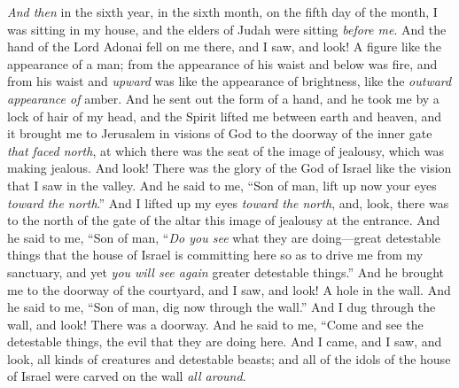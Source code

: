 \begin{biblechapter} %
 \textit{And then} in the sixth year, in the sixth month, on the fifth day of the month, I was sitting in my house, and the elders of Judah were sitting \textit{before me}. And the hand of the Lord Adonai fell on me there,
\verse and I saw, and look! A figure like the appearance of a man; from the appearance of his waist and below was fire, and from his waist and \textit{upward} was like the appearance of brightness, like the \textit{outward appearance of} amber.
\verse And he sent out the form of a hand, and he took me by a lock of hair of my head, and the Spirit lifted me between earth and heaven, and it brought me to Jerusalem in visions of God to the doorway of the inner gate \textit{that faced north}, at which there was the seat of the image of jealousy, which was making jealous.
\verse And look! There was the glory of the God of Israel like the vision that I saw in the valley.
\verse And he said to me, “Son of man, lift up now your eyes \textit{toward the north}.” And I lifted up my eyes \textit{toward the north}, and, look, there was to the north of the gate of the altar this image of jealousy at the entrance.
\verse And he said to me, “Son of man, “\textit{Do you see} what they are doing—great detestable things that the house of Israel is committing here so as to drive me from my sanctuary, and yet \textit{you will see again} greater detestable things.”
\verse And he brought me to the doorway of the courtyard, and I saw, and look! A hole in the wall.
\verse And he said to me, “Son of man, dig now through the wall.” And I dug through the wall, and look! There was a doorway.
\verse And he said to me, “Come and see the detestable things, the evil that they are doing here.
\verse And I came, and I saw, and look, all kinds of creatures and detestable beasts; and all of the idols of the house of Israel were carved on the wall \textit{all around}.

\end{biblechapter}
